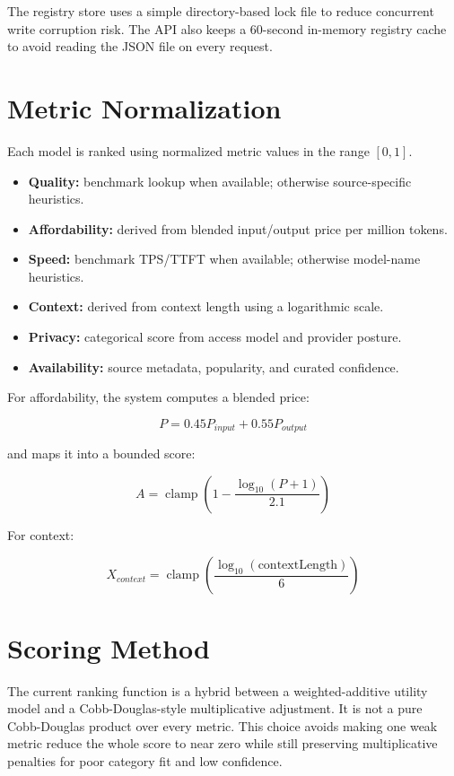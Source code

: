 \documentclass[11pt]{article}
\begin{document}
The registry store uses a simple directory-based lock file to reduce concurrent write corruption risk. The API also keeps a 60-second in-memory registry cache to avoid reading the JSON file on every request.

\section{Metric Normalization}

Each model is ranked using normalized metric values in the range $[0,1]$.

\begin{itemize}[leftmargin=*]
  \item \textbf{Quality:} benchmark lookup when available; otherwise source-specific heuristics.
  \item \textbf{Affordability:} derived from blended input/output price per million tokens.
  \item \textbf{Speed:} benchmark TPS/TTFT when available; otherwise model-name heuristics.
  \item \textbf{Context:} derived from context length using a logarithmic scale.
  \item \textbf{Privacy:} categorical score from access model and provider posture.
  \item \textbf{Availability:} source metadata, popularity, and curated confidence.
\end{itemize}

For affordability, the system computes a blended price:

\[
P = 0.45P_{input} + 0.55P_{output}
\]

and maps it into a bounded score:

\[
A = \operatorname{clamp}\left(1 - \frac{\log_{10}(P + 1)}{2.1}\right)
\]

For context:

\[
X_{context} = \operatorname{clamp}\left(\frac{\log_{10}(\text{contextLength})}{6}\right)
\]

\section{Scoring Method}

The current ranking function is a hybrid between a weighted-additive utility model and a Cobb-Douglas-style multiplicative adjustment. It is not a pure Cobb-Douglas product over every metric. This choice avoids making one weak metric reduce the whole score to near zero while still preserving multiplicative penalties for poor category fit and low confidence.
\end{document}
